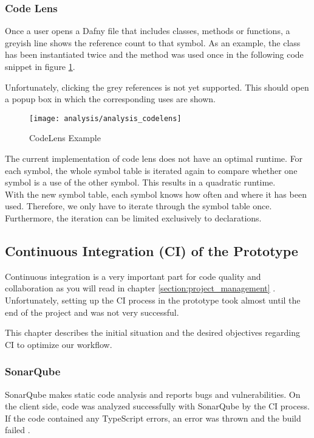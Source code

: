 \subsubsection{Code Lens}
Once a user opens a Dafny file that includes classes, methods or functions, a greyish line shows the reference count to that symbol.
As an example, the class  has been instantiated twice and the method  was used once in the following code snippet in figure \ref{fig:analysis_codelens}.

Unfortunately, clicking the grey references is not yet supported.
This should open a popup box in which the corresponding uses are shown.

\begin{figure}[H]
    \centering
    \texttt{[image: analysis/analysis\_codelens]}
    \caption{CodeLens Example}
    \label{fig:analysis_codelens}
\end{figure}

The current implementation of code lens does not have an optimal runtime.
For each symbol, the whole symbol table is iterated again to compare whether one symbol is a use of the other symbol.
This results in a quadratic runtime. \\

With the new symbol table, each symbol knows how often and where it has been used.
Therefore, we only have to iterate through the symbol table once.
Furthermore, the iteration can be limited exclusively to declarations.




\subsection{Continuous Integration (CI) of the Prototype}
\label{section:analysis:CI}

Continuous integration is a very important part for code quality and collaboration
as you will read in chapter \ref{section:project_management} .
Unfortunately, setting up the CI process in the prototype took almost until the end of the project
and was not very successful.

This chapter describes the initial situation and the desired objectives regarding CI to optimize our workflow.

\subsubsection{SonarQube}
SonarQube makes static code analysis and reports bugs and vulnerabilities.
On the client side, code was analyzed successfully with SonarQube by the CI process.
If the code contained any TypeScript errors, an error was thrown and the build failed \cite{sa}.\\


